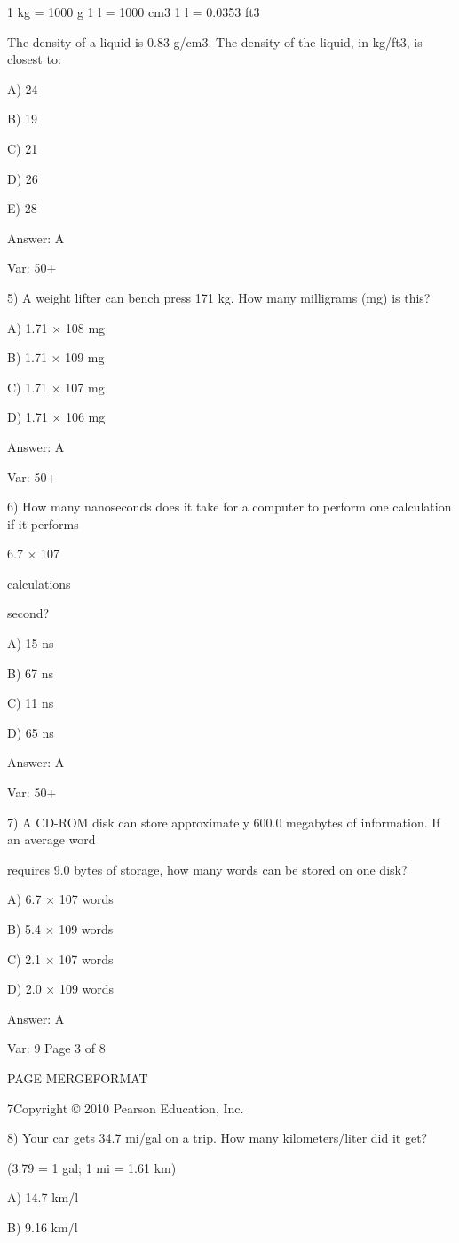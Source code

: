 1 kg = 1000 g 1 l = 1000 cm3 1 l = 0.0353 ft3

The density of a liquid is 0.83 g/cm3. The density of the liquid, in kg/ft3, is closest to:

A) 24

B) 19

C) 21

D) 26

E) 28

Answer: A

Var: 50+

5) A weight lifter can bench press 171 kg. How many milligrams (mg) is this?

A) 1.71 × 108 mg

B) 1.71 × 109 mg

C) 1.71 × 107 mg

D) 1.71 × 106 mg

Answer: A

Var: 50+

6) How many nanoseconds does it take for a computer to perform one calculation if it performs

6.7 × 107

calculations

second?

A) 15 ns

B) 67 ns

C) 11 ns

D) 65 ns

Answer: A

Var: 50+

7) A CD-ROM disk can store approximately 600.0 megabytes of information. If an average word

requires 9.0 bytes of storage, how many words can be stored on one disk?

A) 6.7 × 107 words

B) 5.4 × 109 words

C) 2.1 × 107 words

D) 2.0 × 109 words

Answer: A

Var: 9
Page 3 of 8

PAGE \* MERGEFORMAT

7Copyright © 2010 Pearson Education, Inc.

8) Your car gets 34.7 mi/gal on a trip. How many kilometers/liter did it get?

(3.79 = 1 gal; 1 mi = 1.61 km)

A) 14.7 km/l

B) 9.16 km/l


